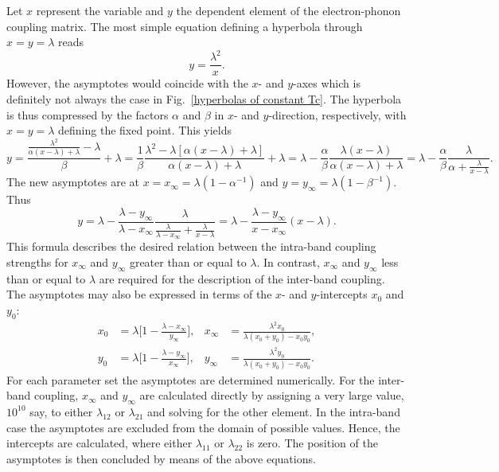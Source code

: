 Let $x$ represent the variable and $y$ the dependent element of the
electron-phonon coupling matrix. The most simple equation defining a hyperbola
through $x = y = \lambda$ reads
%
\begin{equation*}
    y = \frac {\lambda^2} x.
\end{equation*}
%
However, the asymptotes would coincide with the $x$- and $y$-axes which is
definitely not always the case in Fig.~\ref{hyperbolas of constant Tc}. The
hyperbola is thus compressed by the factors $\alpha$ and $\beta$ in $x$- and
$y$-direction, respectively, with $x = y = \lambda$ defining the fixed point.
This yields
%
\begin{equation*}
    y = \frac
        {\frac{\lambda^2} {\alpha (x - \lambda) + \lambda} - \lambda}
        \beta
    + \lambda
    = \frac 1 \beta \frac
        {\lambda^2 - \lambda [\alpha (x - \lambda) + \lambda]}
        {\alpha (x - \lambda) + \lambda}
    + \lambda
    = \lambda - \frac \alpha \beta \frac
        {\lambda (x - \lambda)}
        {\alpha (x - \lambda) + \lambda}
    = \lambda - \frac \alpha \beta \frac
        \lambda
        {\alpha + \frac \lambda {x - \lambda}}.
\end{equation*}
%
The new asymptotes are at $x = x_\infty = \lambda (1 - \alpha^{-1})$ and $y =
y_\infty = \lambda (1 - \beta^{-1})$. Thus
%
\begin{equation*}
    y = \lambda - \frac{\lambda - y_\infty}{\lambda - x_\infty} \frac
        \lambda
        {\frac \lambda {\lambda - x_\infty} + \frac \lambda {x - \lambda}}
    = \lambda - \frac{\lambda - y_\infty}{x - x_\infty} (x - \lambda).
\end{equation*}
%
This formula describes the desired relation between the intra-band coupling
strengths for $x_\infty$ and $y_\infty$ greater than or equal to $\lambda$. In
contrast, $x_\infty$ and $y_\infty$ less than or equal to $\lambda$ are required
for the description of the inter-band coupling. The asymptotes may also be
expressed in terms of the $x$- and $y$-intercepts $x_0$ and $y_0$:
%
\begin{align*}
    x_0 &= \lambda \Big[ 1 - \frac{\lambda - x_\infty}{y_\infty} \Big], &
    x_\infty &= \frac{\lambda^2 x_0}{\lambda (x_0 + y_0) - x_0 y_0}, \\
    y_0 &= \lambda \Big[ 1 - \frac{\lambda - y_\infty}{x_\infty} \Big], &
    y_\infty &= \frac{\lambda^2 y_0}{\lambda (x_0 + y_0) - x_0 y_0}.
\end{align*}
%
For each parameter set the asymptotes are determined numerically. For the
inter-band coupling, $x_\infty$ and $y_\infty$ are calculated directly by
assigning a very large value, $10^{10}$ say, to either $\lambda_{1 2}$ or
$\lambda_{2 1}$ and solving for the other element. In the intra-band case the
asymptotes are excluded from the domain of possible values. Hence, the
intercepts are calculated, where either $\lambda_{1 1}$ or $\lambda_{2 2}$ is
zero. The position of the asymptotes is then concluded by means of the above
equations.

